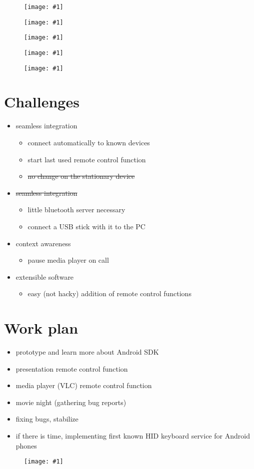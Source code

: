 \documentclass[ddc nogerman]{tudbeamer}
\newcommand{\imageframe}[1]{
    \begin{frame}
        \begin{figure}
            \centering
            \texttt{[image: \#1]}
        \end{figure}
    \end{frame}
}
\begin{document}
\imageframe{img/btauth.png}
\imageframe{img/btactivate.png}
\imageframe{img/choosedevice.png}
\imageframe{img/choosefunction.png}
\imageframe{img/presentation.png}

\section{Challenges}
\begin{frame}
    \begin{itemize}
        \item seamless integration
        \begin{itemize}
            \item connect automatically to known devices
            \item start last used remote control function
            \item\sout{no change on the stationary device}
        \end{itemize}
        \item\sout{seamless integration}
        \begin{itemize}
            \item little bluetooth server necessary
            \item connect a USB stick with it to the PC
        \end{itemize}
        \item context awareness
        \begin{itemize}
            \item pause media player on call
        \end{itemize}
        \item extensible software
        \begin{itemize}
            \item easy (not hacky) addition of remote control functions
        \end{itemize}
    \end{itemize}
\end{frame}

\section{Work plan}
\begin{frame}
    \begin{itemize}
        \item prototype and learn more about Android SDK
        \\ \hfill
        \item presentation remote control function
        \item media player (VLC) remote control function
        \item movie night (gathering bug reports)
        \item fixing bugs, stabilize
        \\ \hfill
        \item if there is time, implementing first known HID keyboard service
            for Android phones
    \end{itemize}
\end{frame}

\imageframe{img/endcat.jpg}
\end{document}
